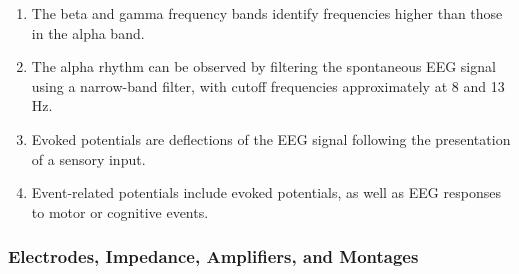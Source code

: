 \begin{enumerate}[label=\arabic*.]
    \item The beta and gamma frequency bands identify frequencies higher than those in the alpha band.
    
    \item The alpha rhythm can be observed by filtering the spontaneous EEG signal using a narrow-band filter, with cutoff frequencies approximately at 8 and 13 Hz.
    
    \item Evoked potentials are deflections of the EEG signal following the presentation of a sensory input.
    
    \item Event-related potentials include evoked potentials, as well as EEG responses to motor or cognitive events.
\end{enumerate}

\subsubsection{Electrodes, Impedance, Amplifiers, and Montages}

